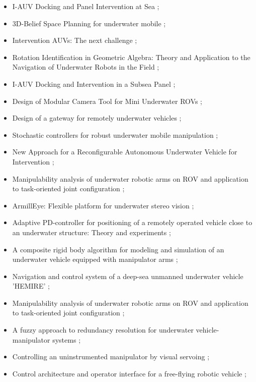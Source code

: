 \begin{itemize}
	\item I-AUV Docking and Panel Intervention at Sea \cite{palomeras2016auv};
	\item 3D-Belief Space Planning for underwater mobile \cite{zereik20153d};
	\item Intervention AUVs: The next challenge \cite{ridao2014intervention};
	\item Rotation Identification in Geometric Algebra: Theory and Application to the Navigation of Underwater Robots in the Field \cite{stanway2015rotation};
	\item I-AUV Docking and Intervention in a Subsea Panel \cite{palomeras2014auv};
	\item Design of Modular Camera Tool for Mini Underwater ROVs \cite{poretti2013design};
	\item Design of a gateway for remotely underwater vehicles \cite{liu2012design};
	\item Stochastic controllers for robust underwater mobile manipulation \cite{bonsignorio2012stochastic};
	\item New Approach for a Reconfigurable Autonomous Underwater Vehicle for Intervention \cite{de2009new};
	\item Manipulability analysis of underwater robotic arms on ROV and application to task-oriented joint configuration \cite{jun2004manipulability};
	\item ArmillEye: Flexible platform for underwater stereo vision \cite{zoppi2007armilleye};
	\item Adaptive PD-controller for positioning of a remotely operated vehicle close to an underwater structure: Theory and experiments \cite{hoang2007adaptive};
	\item A composite rigid body algorithm for modeling and simulation of an underwater vehicle equipped with manipulator arms \cite{hosseini2006composite};
	\item Navigation and control system of a deep-sea unmanned underwater vehicle 'HEMIRE' \cite{lee2007navigation};
	\item Manipulability analysis of underwater robotic arms on ROV and application to task-oriented joint configuration \cite{jun2004manipulability};
	\item A fuzzy approach to redundancy resolution for underwater vehicle-manipulator systems \cite{antonelli2000fuzzy};
	\item Controlling an uninstrumented manipulator by visual servoing \cite{marchand2002controlling};
	\item Control architecture and operator interface for a free-flying robotic vehicle \cite{carignan2001control};

\end{itemize}
